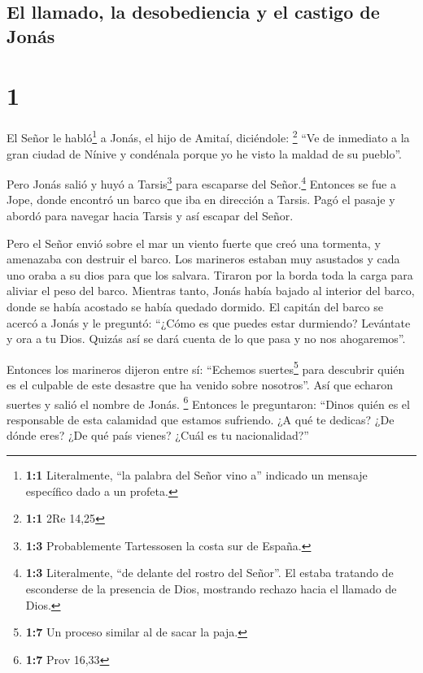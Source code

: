 \hypertarget{el-llamado-la-desobediencia-y-el-castigo-de-jonuxe1s}{%
\subsection{El llamado, la desobediencia y el castigo de
Jonás}\label{el-llamado-la-desobediencia-y-el-castigo-de-jonuxe1s}}

\hypertarget{section}{%
\section{1}\label{section}}

 El Señor le habló\footnote{\textbf{1:1} Literalmente,
  ``la palabra del Señor vino a'' indicado un mensaje específico dado a
  un profeta.} a Jonás, el hijo de Amitaí, diciéndole: \footnote{\textbf{1:1}
  2Re 14,25}  ``Ve de inmediato a la gran ciudad de Nínive
y condénala porque yo he visto la maldad de su pueblo''.

 Pero Jonás salió y huyó a Tarsis\footnote{\textbf{1:3}
  Probablemente Tartessosen la costa sur de España.} para escaparse del
Señor.\footnote{\textbf{1:3} Literalmente, ``de delante del rostro del
  Señor''. El estaba tratando de esconderse de la presencia de Dios,
  mostrando rechazo hacia el llamado de Dios.} Entonces se fue a Jope,
donde encontró un barco que iba en dirección a Tarsis. Pagó el pasaje y
abordó para navegar hacia Tarsis y así escapar del Señor.

 Pero el Señor envió sobre el mar un viento fuerte que
creó una tormenta, y amenazaba con destruir el barco.  Los
marineros estaban muy asustados y cada uno oraba a su dios para que los
salvara. Tiraron por la borda toda la carga para aliviar el peso del
barco. Mientras tanto, Jonás había bajado al interior del barco, donde
se había acostado se había quedado dormido.  El capitán
del barco se acercó a Jonás y le preguntó: ``¿Cómo es que puedes estar
durmiendo? Levántate y ora a tu Dios. Quizás así se dará cuenta de lo
que pasa y no nos ahogaremos''.

 Entonces los marineros dijeron entre sí: ``Echemos
suertes\footnote{\textbf{1:7} Un proceso similar al de sacar la paja.}
para descubrir quién es el culpable de este desastre que ha venido sobre
nosotros''. Así que echaron suertes y salió el nombre de Jonás.
\footnote{\textbf{1:7} Prov 16,33}  Entonces le
preguntaron: ``Dinos quién es el responsable de esta calamidad que
estamos sufriendo. ¿A qué te dedicas? ¿De dónde eres? ¿De qué país
vienes? ¿Cuál es tu nacionalidad?''

